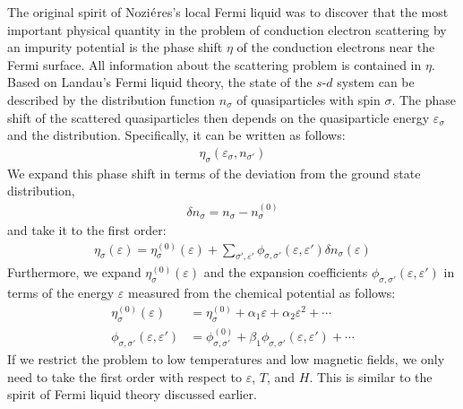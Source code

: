 \documentclass[a4j]{jarticle}
\begin{document}
The original spirit of Nozi$\acute{\rm e}$res's local Fermi liquid was to discover that the most important physical quantity in the problem of conduction electron scattering by an impurity potential is the phase shift $\eta$ of the conduction electrons near the Fermi surface.
All information about the scattering problem is contained in $\eta$.
Based on Landau's Fermi liquid theory, the state of the $s$-$d$ system can be described by the distribution function $n_{\sigma}$ of quasiparticles with spin $\sigma$.
The phase shift of the scattered quasiparticles then depends on the quasiparticle energy $\varepsilon_{\sigma}$ and the distribution.
Specifically, it can be written as follows:
\begin{align}
	\eta_{\sigma}(\varepsilon_{\sigma} , n_{\sigma'})
\end{align}
We expand this phase shift in terms of the deviation from the ground state distribution,
\begin{align}
	\delta n_{\sigma} = n_{\sigma} - n_{\sigma}^{(0)}
\end{align}
and take it to the first order:
\begin{align}
	\eta_{\sigma}(\varepsilon)
	=
	\eta_{\sigma}^{(0)}(\varepsilon)
	+
	\sum_{\sigma',\varepsilon'}
	\phi_{\sigma,\sigma'}(\varepsilon,\varepsilon')
	\delta n_{\sigma}(\varepsilon)
\end{align}
Furthermore, we expand $\eta_{\sigma}^{(0)}(\varepsilon)$ and the expansion coefficients $\phi_{\sigma,\sigma'}(\varepsilon,\varepsilon')$ in terms of the energy $\varepsilon$ measured from the chemical potential as follows:
\begin{align}
	\eta_{\sigma}^{(0)}(\varepsilon)
	 & =
	\eta_{\sigma}^{(0)}
	+
	\alpha_{1} \varepsilon
	+
	\alpha_{2} \varepsilon^{2}
	+
	\cdots
	\\
	\phi_{\sigma,\sigma'}(\varepsilon,\varepsilon')
	 & =
	\phi_{\sigma,\sigma'}^{(0)}
	+
	\beta_{1}
	\phi_{\sigma,\sigma'}(\varepsilon,\varepsilon')
	+
	\cdots
\end{align}
If we restrict the problem to low temperatures and low magnetic fields, we only need to take the first order with respect to $\varepsilon$, $T$, and $H$.
This is similar to the spirit of Fermi liquid theory discussed earlier.

${}$
\end{document}
